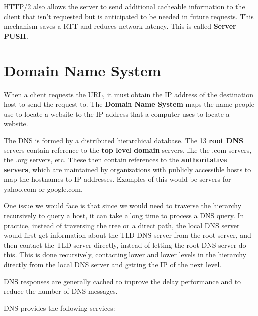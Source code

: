 \documentclass[12pt,letterpaper]{amsbook}
\theoremstyle{definition}
\begin{document}
HTTP/2 also allows the server to send additional cacheable information to the client that isn't requested but is anticipated to be needed in future requests. This mechanism saves a RTT and reduces network latency. This is called \textbf{Server PUSH}.

\section{Domain Name System}

When a client requests the URL, it must obtain the IP address of the destination host to send the request to. The \textbf{Domain Name System} maps the name people use to locate a website to the IP address that a computer uses to locate a website.

The DNS is formed by a distributed hierarchical database. The 13 \textbf{root DNS} servers contain reference to the \textbf{top level domain} servers, like the .com servers, the .org servers, etc. These then contain references to the \textbf{authoritative servers}, which are maintained by organizations with publicly accessible hosts to map the hostnames to IP addresses. Examples of this would be servers for yahoo.com or google.com.

One issue we would face is that since we would need to traverse the hierarchy recursively to query a host, it can take a long time to process a DNS query. In practice, instead of traversing the tree on a direct path, the local DNS server would first get information about the TLD DNS server from the root server, and then contact the TLD server directly, instead of letting the root DNS server do this. This is done recursively, contacting lower and lower levels in the hierarchy directly from the local DNS server and getting the IP of the next level.

DNS responses are generally cached to improve the delay performance and to reduce the number of DNS messages.

DNS provides the following services:
\end{document}
